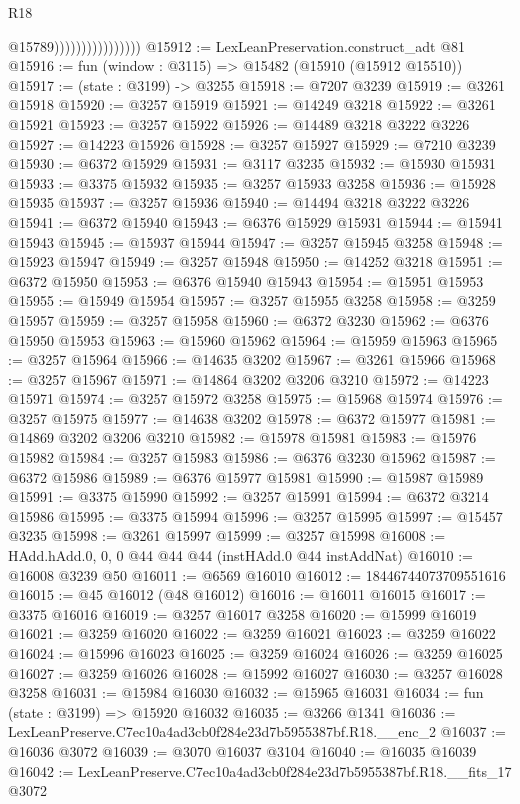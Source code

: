 \begin{lexlean}{R18}
\begin{coremodule}
                                    @15789))))))))))))))))
@15912 := LexLeanPreservation.construct_adt @81
@15916 := fun (window : @3115) => @15482 (@15910 (@15912 @15510))
@15917 := (state : @3199) -> @3255
@15918 := @7207 @3239
@15919 := @3261 @15918
@15920 := @3257 @15919
@15921 := @14249 @3218
@15922 := @3261 @15921
@15923 := @3257 @15922
@15926 := @14489 @3218 @3222 @3226
@15927 := @14223 @15926
@15928 := @3257 @15927
@15929 := @7210 @3239
@15930 := @6372 @15929
@15931 := @3117 @3235
@15932 := @15930 @15931
@15933 := @3375 @15932
@15935 := @3257 @15933 @3258
@15936 := @15928 @15935
@15937 := @3257 @15936
@15940 := @14494 @3218 @3222 @3226
@15941 := @6372 @15940
@15943 := @6376 @15929 @15931
@15944 := @15941 @15943
@15945 := @15937 @15944
@15947 := @3257 @15945 @3258
@15948 := @15923 @15947
@15949 := @3257 @15948
@15950 := @14252 @3218
@15951 := @6372 @15950
@15953 := @6376 @15940 @15943
@15954 := @15951 @15953
@15955 := @15949 @15954
@15957 := @3257 @15955 @3258
@15958 := @3259 @15957
@15959 := @3257 @15958
@15960 := @6372 @3230
@15962 := @6376 @15950 @15953
@15963 := @15960 @15962
@15964 := @15959 @15963
@15965 := @3257 @15964
@15966 := @14635 @3202
@15967 := @3261 @15966
@15968 := @3257 @15967
@15971 := @14864 @3202 @3206 @3210
@15972 := @14223 @15971
@15974 := @3257 @15972 @3258
@15975 := @15968 @15974
@15976 := @3257 @15975
@15977 := @14638 @3202
@15978 := @6372 @15977
@15981 := @14869 @3202 @3206 @3210
@15982 := @15978 @15981
@15983 := @15976 @15982
@15984 := @3257 @15983
@15986 := @6376 @3230 @15962
@15987 := @6372 @15986
@15989 := @6376 @15977 @15981
@15990 := @15987 @15989
@15991 := @3375 @15990
@15992 := @3257 @15991
@15994 := @6372 @3214 @15986
@15995 := @3375 @15994
@15996 := @3257 @15995
@15997 := @15457 @3235
@15998 := @3261 @15997
@15999 := @3257 @15998
@16008 := HAdd.hAdd.{0, 0, 0} @44 @44 @44 (instHAdd.{0} @44 instAddNat)
@16010 := @16008 @3239 @50
@16011 := @6569 @16010
@16012 := 18446744073709551616
@16015 := @45 @16012 (@48 @16012)
@16016 := @16011 @16015
@16017 := @3375 @16016
@16019 := @3257 @16017 @3258
@16020 := @15999 @16019
@16021 := @3259 @16020
@16022 := @3259 @16021
@16023 := @3259 @16022
@16024 := @15996 @16023
@16025 := @3259 @16024
@16026 := @3259 @16025
@16027 := @3259 @16026
@16028 := @15992 @16027
@16030 := @3257 @16028 @3258
@16031 := @15984 @16030
@16032 := @15965 @16031
@16034 := fun (state : @3199) => @15920 @16032
@16035 := @3266 @1341
@16036 := LexLeanPreserve.C7ec10a4ad3cb0f284e23d7b5955387bf.R18.__enc_2
@16037 := @16036 @3072
@16039 := @3070 @16037 @3104
@16040 := @16035 @16039
@16042 := LexLeanPreserve.C7ec10a4ad3cb0f284e23d7b5955387bf.R18.__fits_17 @3072

\end{coremodule}
\end{lexlean}
